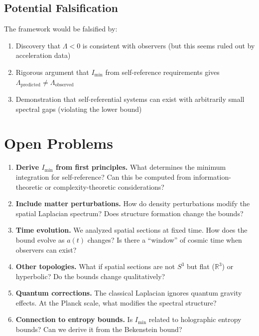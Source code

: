 \documentclass[11pt,a4paper]{article}
\theoremstyle{plain}
\theoremstyle{definition}
\theoremstyle{remark}
\begin{document}
\subsection{Potential Falsification}

The framework would be falsified by:

\begin{enumerate}
    \item Discovery that $\Lambda < 0$ is consistent with observers (but this seems ruled out by acceleration data)

    \item Rigorous argument that $I_{\min}$ from self-reference requirements gives $\Lambda_{\text{predicted}} \neq \Lambda_{\text{observed}}$

    \item Demonstration that self-referential systems can exist with arbitrarily small spectral gaps (violating the lower bound)
\end{enumerate}

\section{Open Problems}

\begin{enumerate}
    \item \textbf{Derive $I_{\min}$ from first principles.} What determines the minimum integration for self-reference? Can this be computed from information-theoretic or complexity-theoretic considerations?

    \item \textbf{Include matter perturbations.} How do density perturbations modify the spatial Laplacian spectrum? Does structure formation change the bounds?

    \item \textbf{Time evolution.} We analyzed spatial sections at fixed time. How does the bound evolve as $a(t)$ changes? Is there a ``window'' of cosmic time when observers can exist?

    \item \textbf{Other topologies.} What if spatial sections are not $S^3$ but flat ($\mathbb{R}^3$) or hyperbolic? Do the bounds change qualitatively?

    \item \textbf{Quantum corrections.} The classical Laplacian ignores quantum gravity effects. At the Planck scale, what modifies the spectral structure?

    \item \textbf{Connection to entropy bounds.} Is $I_{\min}$ related to holographic entropy bounds? Can we derive it from the Bekenstein bound?
\end{enumerate}
\end{document}
